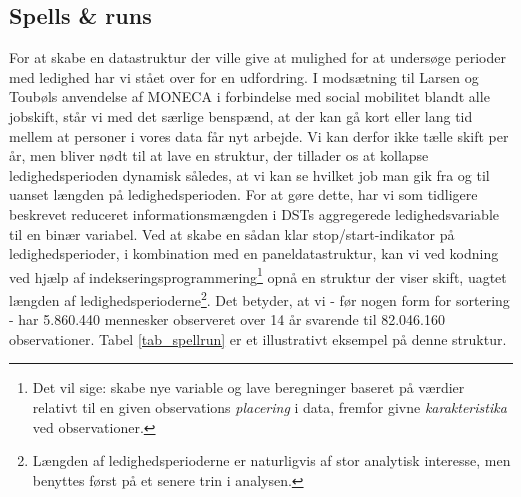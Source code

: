 \subsection{Spells \& runs \label{ledig_spellsrun}} 

For at skabe en datastruktur der ville give at mulighed for at undersøge perioder med ledighed har vi stået over for en udfordring. I modsætning til Larsen og Toubøls anvendelse af MONECA i forbindelse med social mobilitet blandt alle jobskift, står vi med det særlige benspænd, at der kan gå kort eller lang tid mellem at personer i vores data får nyt arbejde. Vi kan derfor ikke tælle skift per år, men bliver nødt til at lave en struktur, der tillader os at kollapse ledighedsperioden dynamisk således, at vi kan se hvilket job man gik fra og til uanset længden på ledighedsperioden. For at gøre dette, har vi som tidligere beskrevet reduceret informationsmængden i DSTs aggregerede ledighedsvariable til en binær variabel. Ved at skabe en sådan klar stop/start-indikator på ledighedsperioder, i kombination med en paneldatastruktur, kan vi ved kodning ved hjælp af indekseringsprogrammering\footnote{Det vil sige: skabe nye variable og lave beregninger baseret på værdier relativt til en given observations \emph{placering} i data, fremfor givne \emph{karakteristika} ved observationer.} opnå en struktur der viser skift, uagtet længden af ledighedsperioderne\footnote{Længden af ledighedsperioderne er naturligvis af stor analytisk interesse, men benyttes først på et senere trin i analysen.}. Det betyder, at vi - før nogen form for sortering - har 5.860.440 mennesker observeret over 14 år svarende til 82.046.160 observationer. Tabel \ref{tab_spellrun} er et illustrativt eksempel på denne struktur. 
%
